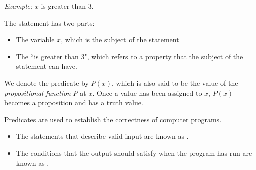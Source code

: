 \pagebreak

            \par \textit{Example:} $x$ is greater than 3.
            \par The statement has two parts:
            \begin{itemize}
                \item The variable $x$, which is the subject of the statement
                \item The  ``is greater than 3", which refers to a property
                that the subject of the statement can have.
            \end{itemize}

            \par We denote the predicate by $P(x)$, which is also said to be the value of the
            \textit{propositional function} $P$ at $x$. Once a value has been assigned to $x$,
            $P(x)$ becomes a proposition and has a truth value.

            \par Predicates are used to establish the correctness of computer programs.
            \begin{itemize}
                \item The statements that describe valid input are known as
                    .
                \item The conditions that the output should satisfy when the program has run
                    are known as .
            \end{itemize}
    \hiiEND


